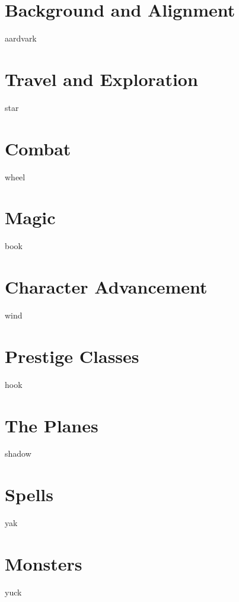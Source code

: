 \documentclass[12pt,twoside,onecolumn,openany,final]{memoir}
\begin{document}
\chapter{Background and Alignment}
aardvark



\chapter{Travel and Exploration}
star
\chapter{Combat}
wheel
\chapter{Magic}
book
\chapter{Character Advancement}
wind
\chapter{Prestige Classes}
hook



\chapter{The Planes}
shadow


\appendix
\appendixpage

\makeatletter
\renewcommand{\@makechapterhead}[1]{%
\vspace*{0 pt}{
\raggedright \normalfont \fontsize{32}{32} \selectfont \bfseries
\ifnum \value{secnumdepth}>-1
  \if@mainmatter \vspace{-8pt} {\fontsize{20}{20} \selectfont Appendix \thechapter:}\\[8pt]
  \fi%
\fi
\hspace{0.65cm} #1\par\nobreak\vspace{20 pt}
}}
\makeatother

\clearpage


\chapter{Spells}
yak
\chapter{Monsters}
yuck




\clearpage
{}
\listoftables

\clearpage
{}
\printindex
\end{document}
